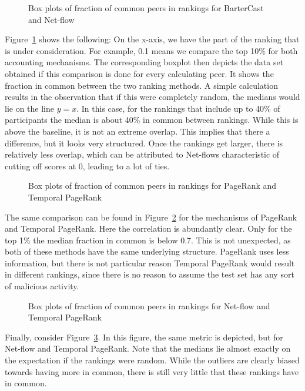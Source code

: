 \documentclass[a4paper,11pt]{book}
\theoremstyle{definition}
\begin{document}
\begin{figure}[ht]
    \centering
    
    \caption{Box plots of fraction of common peers in rankings for BarterCast and Net-flow}
    \label{fig:box_bc_netflow}
\end{figure}

Figure~\ref{fig:box_bc_netflow} shows the following: On the x-axis, we have the part
of the ranking that is under consideration. For example, 0.1 means we compare the
top 10\% for both accounting mechanisms. The corresponding boxplot then depicts
the data set obtained if this comparison is done for every calculating peer. It shows
the fraction in common between the two ranking methods. A simple calculation results
in the observation that if this were completely random, the medians would lie on
the line $y=x$. In this case, for the rankings that include up to 40\% of participants
the median is about 40\% in common between rankings. While this is above the baseline,
it is not an extreme overlap. This implies that there a difference, but it looks very
structured. Once the rankings get larger, there is relatively less overlap, which
can be attributed to Net-flows characteristic of cutting off scores at 0, leading
to a lot of ties.


\begin{figure}[ht]
    \centering
    
    \caption{Box plots of fraction of common peers in rankings for PageRank and Temporal PageRank}
    \label{fig:box_pr_tpr}
\end{figure}

The same comparison can be found in Figure~\ref{fig:box_pr_tpr} for the mechanisms of PageRank
and Temporal PageRank. Here the correlation is abundantly clear. Only for the top 1\% the
median fraction in common is below 0.7. This is not unexpected, as both of these methods
have the same underlying structure. PageRank uses less information, but there is not particular
reason Temporal PageRank would result in different rankings, since there is no reason to
assume the test set has any sort of malicious activity.

\begin{figure}[ht]
    \centering
    
    \caption{Box plots of fraction of common peers in rankings for Net-flow and Temporal PageRank}
    \label{fig:box_netflow_tpr}
\end{figure}

Finally, consider Figure~\ref{fig:box_netflow_tpr}. In this figure, the same metric is depicted, but
for Net-flow and Temporal PageRank. Note that the medians lie almost exactly on the expectation
if the rankings were random. While the outliers are clearly biased towards having more in common,
there is still very little that these rankings have in common.
















{}

\end{document}
